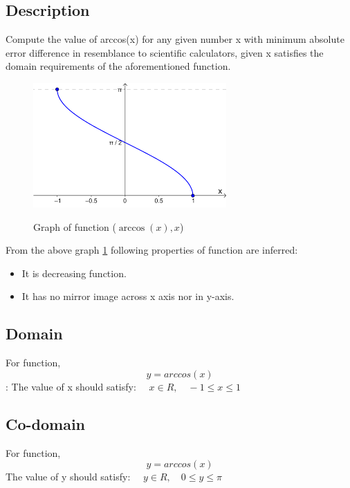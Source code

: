 \documentclass[a4paper,12pt]{article}
\begin{document}
    \subsection{Description \cite{Arc cosine}}
    Compute the value of arccos(x) for any given number x with minimum absolute error difference in resemblance to scientific calculators, given x satisfies the domain requirements of the aforementioned function.
    \begin{figure}[htp]
     \centering
     \includegraphics[scale=1]{download.png}\\[1cm]
     \label{fig:graph}
     \caption{Graph of function ($\arccos(x), x$)}
    \end{figure}

From the above graph \ref{fig:graph} following properties of function are inferred:
    \begin{itemize}
        \item {It is decreasing function.}
        \item{It has no mirror image across x axis nor in y-axis.}
    \end{itemize}
    \subsection{Domain}
    {For function, \[y = arccos(x)\]:
    \newline
    The value of x should satisfy: 
    \begin{math}
    {\quad x  \in  R, \quad -1 \leq x \leq 1}
    \end{math}
    }
    \subsection{Co-domain}
    {For function, \[y = arccos(x)\]
    \newline
    The value of y should satisfy:
    \begin{math}
    {\quad y \in R, \quad 0 \leq y \leq \pi}
    \end{math}
    }
\end{document}
